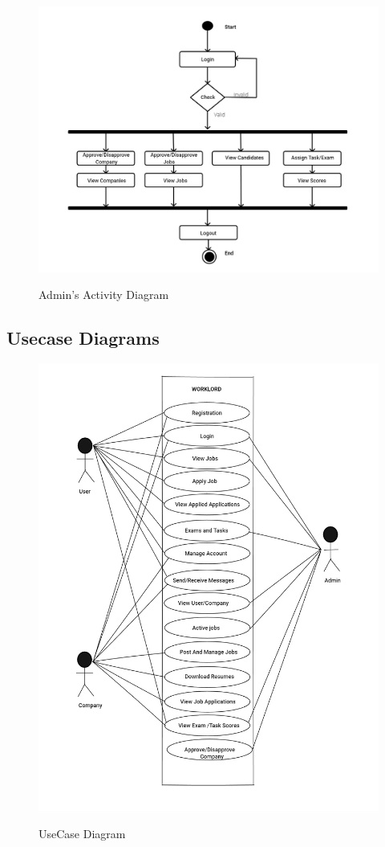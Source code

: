 \documentclass[a4paper,12pt]{report}
\begin{document}
\pagebreak

\vspace*{12pt}
\begin{figure}[bph]
	\centering
	\includegraphics[width=1.1\linewidth]{img/adminactivity}
	\label{fig:adminractivity}
	\caption{Admin's Activity Diagram}
\end{figure}
\pagebreak
\subsection{Usecase Diagrams}

\vspace*{12pt}
\begin{figure}[bph]
	\centering
	\includegraphics[width=.7\linewidth]{img/use_case_diagram}
	\label{fig:usecasediagram}
	\caption{UseCase Diagram}
\end{figure}
\pagebreak
\end{document}

